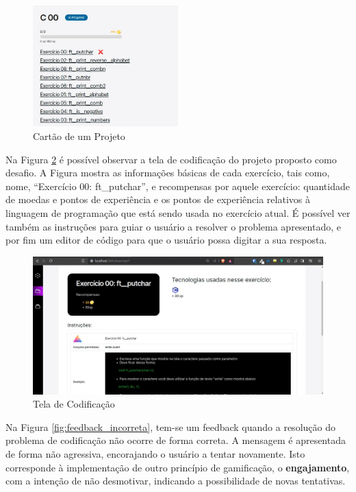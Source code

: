 \documentclass[12pt]{article}
\begin{document}
\begin{figure}[ht!]
\centering
\includegraphics[width=0.5\textwidth]{imagens/cartao_projeto.jpg}
\caption{Cartão de um Projeto}
\label{fig:cartao_projeto}
\end{figure}

Na Figura \ref{fig:tela_codificacao} é possível observar a tela de codificação do projeto proposto como desafio. A Figura mostra as informações básicas de cada exercício, tais como, nome, “Exercício 00: ft\_putchar”, e recompensas por aquele exercício: quantidade de moedas e pontos de experiência e os pontos de experiência relativos à linguagem de programação que está sendo usada no exercício atual. É possível ver também as instruções para guiar o usuário a resolver o problema apresentado, e por fim um editor de código para que o usuário possa digitar a sua resposta.

\begin{figure}[ht!]
\centering
\includegraphics[width=1.0\textwidth]{imagens/resolucao_desafio.jpg}
\caption{Tela de Codificação}
\label{fig:tela_codificacao}
\end{figure}

Na Figura \ref{fig:feedback_incorreta}, tem-se um feedback quando a resolução do problema de codificação não ocorre de forma correta. A mensagem é apresentada de forma não agressiva, encorajando o usuário a tentar novamente. Isto corresponde à implementação de outro princípio de gamificação, o \textbf{engajamento}, com a intenção de não desmotivar, indicando a possibilidade de novas tentativas. 
\end{document}
